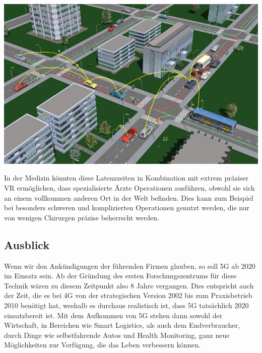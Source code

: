 \begin{multicols}{3}
\begin{Figure}
\includegraphics[width=\linewidth]{Kapitel/5G/Grafiken/c2c}
\label{fig:5g.c2c}
\end{Figure}

In der Medizin könnten diese Latenzzeiten in Kombination mit extrem präziser VR ermöglichen, dass spezialisierte Ärzte Operationen ausführen, obwohl sie sich an einem vollkommen anderen Ort in der Welt befinden. Dies kann zum Beispiel bei besonders schweren und komplizierten Operationen genutzt werden, die nur von wenigen Chirurgen präzise beherrscht werden.\cite{5g.10}
\subsection*{Ausblick}
Wenn wir den Ankündigungen der führenden Firmen glauben, so soll 5G ab 2020 im Einsatz sein. Ab der Gründung des ersten Forschungszentrums für diese Technik wären zu diesem Zeitpunkt also 8 Jahre vergangen.
Dies entspricht auch der Zeit, die es bei 4G von der strategischen Version 2002 bis zum Praxisbetrieb 2010 benötigt hat, weshalb es durchaus realistisch ist, dass 5G tatsächlich 2020 einsatzbereit ist. 
Mit dem Aufkommen von 5G stehen dann sowohl der Wirtschaft, in Bereichen wie Smart Logistics, als auch dem Endverbraucher, durch Dinge wie selbstfahrende Autos und Health Monitoring, ganz neue Möglichkeiten zur Verfügung, die das Leben verbessern können.

\printbibliography[segment=10,heading=subbibliography]
\end{multicols}

\newpage
